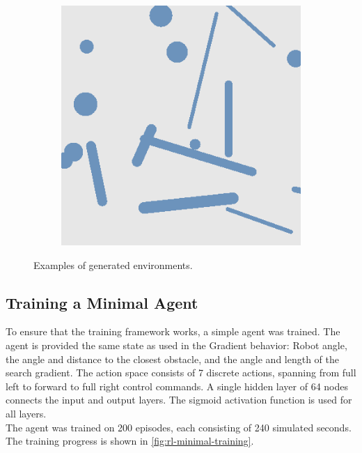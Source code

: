 \begin{figure}[H]
\begin{subfigure}{\w}
    \end{subfigure}
    \hspace*{\fill}
    \begin{subfigure}{\w}
        \includegraphics[width=\linewidth]{figures/generated-worlds/world_5.png}
    \end{subfigure}
    \caption{Examples of generated environments.}
    \label{fig:generated-enviornments}
\end{figure}

\subsection{Training a Minimal Agent}
To ensure that the training framework works, a simple agent was trained. The agent is provided the same state as used in the Gradient behavior: Robot angle, the angle and distance to the closest obstacle, and the angle and length of the search gradient. The action space consists of 7 discrete actions, spanning from full left to forward to full right control commands. A single hidden layer of 64 nodes connects the input and output layers. The sigmoid activation function is used for all layers. \\

The agent was trained on 200 episodes, each consisting of 240 simulated seconds. The training progress is shown in \cref{fig:rl-minimal-training}.

